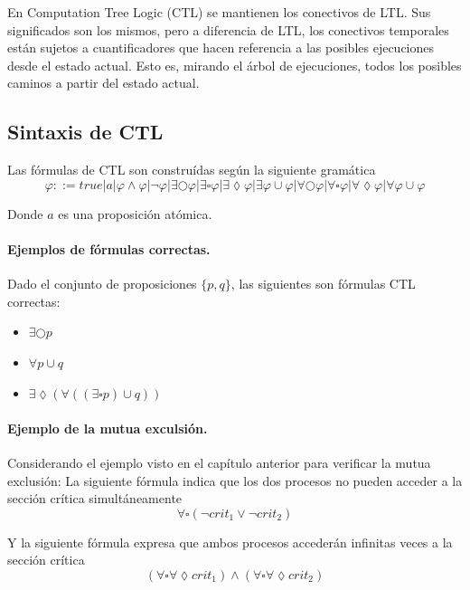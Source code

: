 En Computation Tree Logic (CTL) se mantienen los conectivos de LTL. Sus significados son
 los mismos, pero a diferencia de LTL, los conectivos temporales están sujetos a cuantificadores
que hacen referencia a las posibles ejecuciones desde el estado actual. Esto es, mirando
 el árbol de ejecuciones, todos los posibles caminos a partir del estado actual.

\subsection{Sintaxis de CTL}

Las fórmulas de CTL son construídas según la siguiente gramática
\[ \varphi ::= true | a | \varphi \wedge \varphi | \lnot \varphi | \exists \bigcirc \varphi | \exists \square \varphi | \exists \lozenge \varphi | \exists \varphi \cup \varphi | \forall \bigcirc \varphi | \forall \square \varphi | \forall \lozenge \varphi | \forall \varphi \cup \varphi \]

Donde $a$ es una proposición atómica.	

\paragraph{Ejemplos de fórmulas correctas.} 

Dado el conjunto de proposiciones $\{p, q\}$, las siguientes son fórmulas CTL correctas:
\begin{itemize}
\item $\exists \bigcirc p $
\item $\forall p \cup q $
\item $\exists \lozenge (\forall ((\exists \square p) \cup q)) $
\end{itemize}



\paragraph{Ejemplo de la mutua exculsión.}
Considerando el ejemplo visto en el capítulo anterior para verificar la mutua exclusión:
La siguiente fórmula indica que los dos procesos no pueden acceder a la sección crítica simultáneamente
\[ \forall \square (\neg crit_1 \vee \neg crit_2) \]

Y la siguiente fórmula expresa que ambos procesos accederán infinitas veces a
 la sección crítica
\[ (\forall \square \forall \lozenge crit_1) \wedge (\forall \square \forall \lozenge crit_2) \]




